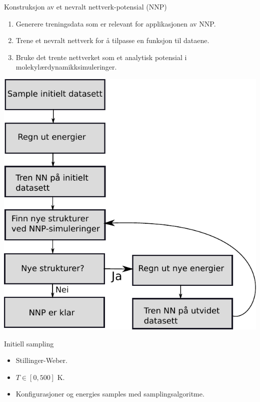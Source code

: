 \documentclass{beamer}
\begin{document}
\begin{frame}

\begin{block}{Konstruksjon av et nevralt nettverk-potensial (NNP)}
 \begin{enumerate}
  \item Generere treningsdata som er relevant for applikasjonen av NNP. 
  \item Trene et nevralt nettverk for å tilpasse en funksjon til dataene. 
  \item Bruke det trente nettverket som et analytisk potensial i molekylærdynamikksimuleringer. 
 \end{enumerate}
\end{block}

\end{frame}


\begin{frame}
 
\centering
\includegraphics[width=0.7\linewidth]{../Figures/Presentation/iterativeSampling.pdf} 

\end{frame}


\begin{frame}

\begin{block}{Initiell sampling}
 \begin{itemize}
  \item Stillinger-Weber. 
  \item $T \in [0,500]$ K. 
  \item Konfigurasjoner og energies samples med samplingsalgoritme.  
 \end{itemize}
\end{block}

\end{frame}
\end{document}
